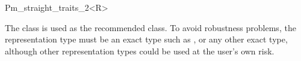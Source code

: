 
\ccRefPageBegin


\begin {ccRefClass} {Pm_straight_traits_2<R>}
    
    The class 
    is used as the recommended class. To avoid robustness problems, 
    the representation type  must be an exact type such as
    ,
     or any other exact type,
    although other representation types could be used at the user's own risk.

 
\ccIsModel
    \\

    


     
 
\end{ccRefClass} %
\ccRefPageEnd
